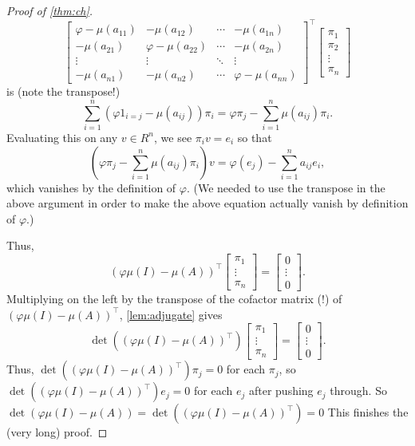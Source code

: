 \begin{proof}[Proof of \autoref{thm:ch}]
	\[\begin{bmatrix}
		\varphi-\mu(a_{11}) & -\mu(a_{12}) & \cdots & -\mu(a_{1n}) \\
		-\mu(a_{21}) & \varphi-\mu(a_{22}) & \cdots & -\mu(a_{2n}) \\
		\vdots & \vdots & \ddots & \vdots \\
		-\mu(a_{n1}) & -\mu(a_{n2}) & \cdots & \varphi-\mu(a_{nn})
	\end{bmatrix}^\intercal\begin{bmatrix}
		\pi_1 \\
		\pi_2 \\
		\vdots \\
		\pi_n
	\end{bmatrix}\]
	is (note the transpose!)
	\[\sum_{i=1}^n(\varphi1_{i=j}-\mu(a_{ij}))\pi_i=\varphi\pi_j-\sum_{i=1}^n\mu(a_{ij})\pi_i.\]
	Evaluating this on any $v\in R^n$, we see $\pi_iv=e_i$ so that
	\[\left(\varphi\pi_j-\sum_{i=1}^n\mu(a_{ij})\pi_i\right)v=\varphi(e_j)-\sum_{i=1}^na_{ij}e_i,\]
	which vanishes by the definition of $\varphi$. (We needed to use the transpose in the above argument in order to make the above equation actually vanish by definition of $\varphi$.)

	Thus,
	\[(\varphi\mu(I)-\mu(A))^\intercal\begin{bmatrix}
		\pi_1 \\
		\vdots \\
		\pi_n
	\end{bmatrix}=\begin{bmatrix}
		0 \\
		\vdots \\
		0
	\end{bmatrix}.\]
	Multiplying on the left by the transpose of the cofactor matrix (!) of $(\varphi\mu(I)-\mu(A))^\intercal$, \autoref{lem:adjugate} gives
	\[\det\left((\varphi\mu(I)-\mu(A))^\intercal\right)\begin{bmatrix}
		\pi_1 \\
		\vdots \\
		\pi_n
	\end{bmatrix}=\begin{bmatrix}
		0 \\
		\vdots \\
		0
	\end{bmatrix}.\]
	Thus, $\det\left((\varphi\mu(I)-\mu(A))^\intercal\right)\pi_j=0$ for each $\pi_j$, so $\det\left((\varphi\mu(I)-\mu(A))^\intercal\right)e_j=0$ for each $e_j$ after pushing $e_j$ through. So $\det(\varphi\mu(I)-\mu(A))=\det\left((\varphi\mu(I)-\mu(A))^\intercal\right)=0$ This finishes the (very long) proof.
\end{proof}

